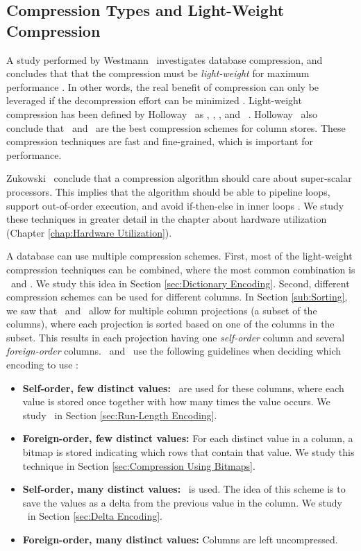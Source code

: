 \subsection{Compression Types and Light-Weight Compression}
\label{sub:Compression Types and Light-Weight Compression}
A study performed by Westmann \ea~investigates database compression, and concludes that that the compression must be \textit{light-weight} for maximum performance \cite{Westmann2000-mz}. In other words, the real benefit of compression can only be leveraged if the decompression effort can be minimized \cite{Lemke2010-is}. Light-weight compression has been defined by Holloway \ea~as \bp, \de, \dele, and \rle~\cite{Holloway2008-rr}. Holloway \ea~also conclude that \de~and \rle~are the best compression schemes for column stores. These compression techniques are fast and fine-grained, which is important for performance.

Zukowski \ea~conclude that a compression algorithm should care about super-scalar processors. This implies that the algorithm should be able to pipeline loops, support out-of-order execution, and avoid if-then-else in inner loops \cite{Zukowski2006-oz}. We study these techniques in greater detail in the chapter about hardware utilization (Chapter \ref{chap:Hardware Utilization}). 

A database can use multiple compression schemes. First, most of the light-weight compression techniques can be combined, where the most common combination is \de~and \bp. We study this idea in Section \ref{sec:Dictionary Encoding}. Second, different compression schemes can be used for different columns. In Section \ref{sub:Sorting}, we saw that \cstore~and \vertica~allow for multiple column projections (a subset of the columns), where each projection is sorted based on one of the columns in the subset. This results in each projection having one \textit{self-order} column and several \textit{foreign-order} columns.  \cstore~and \vertica~use the following guidelines when deciding which encoding to use \cite{Stonebraker2005-qz}: 

\begin{itemize}
  \item \textbf{Self-order, few distinct values:} \rle~are used for these columns, where each value is stored once together with how many times the value occurs. We study \rle~in Section \ref{sec:Run-Length Encoding}.
  \item \textbf{Foreign-order, few distinct values:} For each distinct value in a column, a bitmap is stored indicating which rows that contain that value. We study this technique in Section \ref{sec:Compression Using Bitmaps}.
  \item \textbf{Self-order, many distinct values:} \dele~is used. The idea of this scheme is to save the values as a delta from the previous value in the column. We study \dele~in Section \ref{sec:Delta Encoding}.
  \item \textbf{Foreign-order, many distinct values:} Columns are left uncompressed.
\end{itemize}

